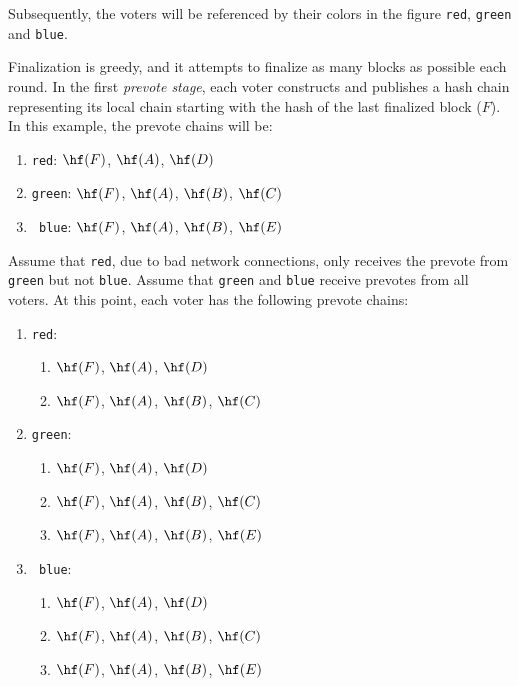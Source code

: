 Subsequently, the voters will be referenced by their colors in the figure \texttt{red}, \texttt{green} and \texttt{blue}.

Finalization is greedy, and it attempts to finalize as many blocks as possible each round.
In the first \emph{prevote stage}, each voter constructs and publishes a hash chain representing its local chain starting with the hash of the last finalized block ($F$).
In this example, the prevote chains will be:

\begin{enumerate}
	\item{\texttt{\space\space red}: $\hf(F)$, $\hf(A)$, $\hf(D)$}
	\item{\texttt{green}: $\hf(F)$, $\hf(A)$, $\hf(B)$, $\hf(C)$}
	\item{\texttt{ blue}: $\hf(F)$, $\hf(A)$, $\hf(B)$, $\hf(E)$}
\end{enumerate}

Assume that \texttt{red}, due to bad network connections, only receives the prevote from \texttt{green} but not \texttt{blue}.
Assume that \texttt{green} and \texttt{blue} receive prevotes from all voters.
At this point, each voter has the following prevote chains:

\begin{enumerate}
	\item{\texttt{\space\space red}:
		\begin{enumerate}
			\item{$\hf(F)$, $\hf(A)$, $\hf(D)$}
			\item{$\hf(F)$, $\hf(A)$, $\hf(B)$, $\hf(C)$}
		\end{enumerate}
	}
	\item{\texttt{green}:
		\begin{enumerate}
			\item{$\hf(F)$, $\hf(A)$, $\hf(D)$}
			\item{$\hf(F)$, $\hf(A)$, $\hf(B)$, $\hf(C)$}
			\item{$\hf(F)$, $\hf(A)$, $\hf(B)$, $\hf(E)$}
		\end{enumerate}
	}
	\item{\texttt{ blue}:
		\begin{enumerate}
			\item{$\hf(F)$, $\hf(A)$, $\hf(D)$}
			\item{$\hf(F)$, $\hf(A)$, $\hf(B)$, $\hf(C)$}
			\item{$\hf(F)$, $\hf(A)$, $\hf(B)$, $\hf(E)$}
		\end{enumerate}
	}
\end{enumerate}

